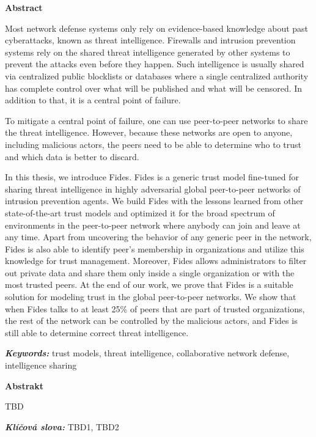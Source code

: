 \newenvironment{abstractpage}
  {\cleardoublepage\thispagestyle{empty}}
  {\vfill\cleardoublepage}
\newenvironment{abstract}[1]
  {\bigskip
   \begin{center}\bfseries#1\end{center}\small\leftskip=0.5cm\rightskip=0.5cm}
  {\par\bigskip}

\providecommand{\keywords}[2]{\footnotesize\textbf{\textit{#1:}} #2}

\begin{abstractpage}
\begin{abstract}{Abstract}

Most network defense systems only rely on evidence-based knowledge about past cyberattacks, known as threat intelligence. Firewalls and intrusion prevention systems rely on the shared threat intelligence generated by other systems to prevent the attacks even before they happen.
Such intelligence is usually shared via centralized public blocklists or databases where a single centralized authority has complete control over what will be published and what will be censored. In addition to that, it is a central point of failure.

To mitigate a central point of failure, one can use peer-to-peer networks to share the threat intelligence. However, because these networks are open to anyone, including malicious actors, the peers need to be able to determine who to trust and which data is better to discard.

In this thesis, we introduce Fides. Fides is a generic trust model fine-tuned for sharing threat intelligence in highly adversarial global peer-to-peer networks of intrusion prevention agents.
We build Fides with the lessons learned from other state-of-the-art trust models and optimized it for the broad spectrum of environments in the peer-to-peer network where anybody can join and leave at any time.
Apart from uncovering the behavior of any generic peer in the network, Fides is also able to identify peer's membership in organizations and utilize this knowledge for trust management.
Moreover, Fides allows administrators to filter out private data and share them only inside a single organization or with the most trusted peers. 
At the end of our work, we prove that Fides is a suitable solution for modeling trust in the global peer-to-peer networks. We show that when Fides talks to at least 25\% of peers that are part of trusted organizations, the rest of the network can be controlled by the malicious actors, and Fides is still able to determine correct threat intelligence.

\end{abstract}

\keywords{Keywords}{trust models, threat intelligence, collaborative network defense, intelligence sharing}

\vspace*{\fill}

\newpage
\begin{abstract}{Abstrakt}
    TBD 
    
\end{abstract}
\keywords{Klíčová slova}{TBD1, TBD2} 

\end{abstractpage}
\thispagestyle{empty}

\cleardoublepage